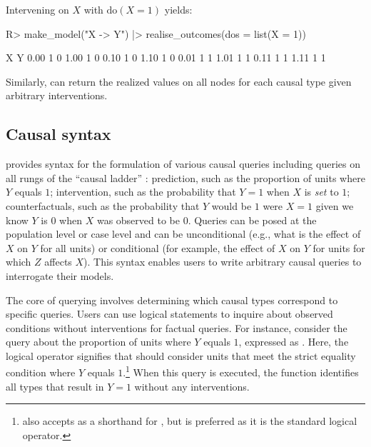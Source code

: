\documentclass[
  11pt,
  article]{jss}
\renewcommand{\texttt}[1]{\code{#1}}
\begin{document}
Intervening on \(X\) \citep[see][]{pearl_causality_2009} with
\(\text{do}(X=1)\) yields:

\begin{CodeChunk}
\begin{CodeInput}
R> make_model("X -> Y") |> realise_outcomes(dos = list(X = 1))
\end{CodeInput}

\begin{CodeOutput}
     X Y
0.00 1 0
1.00 1 0
0.10 1 0
1.10 1 0
0.01 1 1
1.01 1 1
0.11 1 1
1.11 1 1
\end{CodeOutput}
\end{CodeChunk}

Similarly, \texttt{realise\_outcomes()} can return the realized values
on all nodes for each causal type given arbitrary interventions.

\subsection{Causal syntax}\label{sec-syntax}

 provides syntax for the formulation of various
causal queries including queries on all rungs of the ``causal ladder''
\citep{pearl_causality_2009}: prediction, such as the proportion of
units where \(Y\) equals \(1\); intervention, such as the probability
that \(Y = 1\) when \(X\) is \emph{set} to \(1\); counterfactuals, such
as the probability that \(Y\) would be \(1\) were \(X = 1\) given we
know \(Y\) is \(0\) when \(X\) was observed to be \(0\). Queries can be
posed at the population level or case level and can be unconditional
(e.g., what is the effect of \(X\) on \(Y\) for all units) or
conditional (for example, the effect of \(X\) on \(Y\) for units for
which \(Z\) affects \(X\)). This syntax enables users to write arbitrary
causal queries to interrogate their models.

The core of querying involves determining which causal types correspond
to specific queries. Users can use logical statements to inquire about
observed conditions without interventions for factual queries. For
instance, consider the query about the proportion of units where \(Y\)
equals \(1\), expressed as \texttt{"Y\ ==\ 1"}. Here, the logical
operator \texttt{==} signifies that  should consider
units that meet the strict equality condition where \(Y\) equals
\(1\).\footnote{ also accepts \texttt{=} as a
  shorthand for \texttt{==}, but \texttt{==} is preferred as it is the
  standard logical operator.} When this query is executed, the
\texttt{get\_query\_types()} function identifies all types that result
in \(Y=1\) without any interventions.
\end{document}
